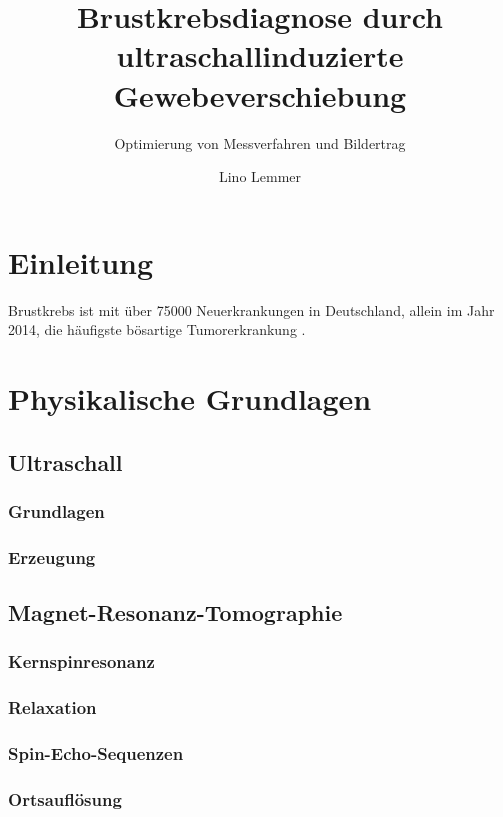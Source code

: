 \documentclass[
    11pt,
    ngerman
]{scrreprt}
\author{Lino Lemmer}
\title{Brustkrebsdiagnose durch ultraschallinduzierte Gewebeverschiebung}
\subtitle{Optimierung von Messverfahren und Bildertrag}
\begin{document}
\maketitle


\tableofcontents

\chapter{Einleitung}

Brustkrebs ist mit über 75000 Neuerkrankungen in Deutschland, allein im Jahr 2014, die häufigste bösartige Tumorerkrankung \parencite[68]{krebs_in_deutschland}.

\chapter{Physikalische Grundlagen}

\section{Ultraschall}

\subsection{Grundlagen}

\subsection{Erzeugung}

\section{Magnet-Resonanz-Tomographie}

\subsection{Kernspinresonanz}

\subsection{Relaxation}

\subsection{Spin-Echo-Sequenzen}

\subsection{Ortsauflösung}
\end{document}
